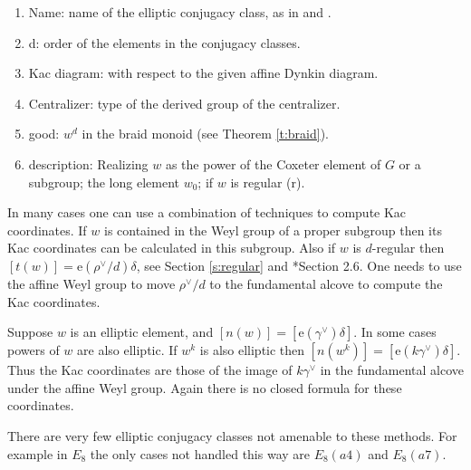 \documentclass[10pt,leqno]{article}
\newcommand{\ch}[1]{#1^\vee}
\newcommand{\e}{\text{e}}
\begin{document}
\begin{enumerate}
\item Name: name of the elliptic conjugacy class, as in \cite{carter_conjugacy_classes} and \cite{geck_pfeiffer}.
\item d: order of the elements in the conjugacy classes.
\item Kac diagram: with respect to the given affine Dynkin diagram.
\item Centralizer: type of the derived group of the centralizer.
\item good: $w^d$ in the braid monoid (see Theorem \ref{t:braid}).
\item description: Realizing $w$ as the power of the Coxeter element of $G$ or a subgroup;
  the long element $w_0$;
if $w$ is regular (r).
\end{enumerate}

In many cases one can use a combination of techniques to compute Kac
coordinates.  If $w$ is contained in the Weyl group of a proper subgroup
then its Kac coordinates can
be calculated in this subgroup. 
Also if  $w$ is $d$-regular then $[t(w)]=\e(\ch\rho/d)\delta$, see Section
\ref{s:regular} and \cite{reeder_torsion}*{Section 2.6}.  
One needs to use the affine Weyl group to move $\ch\rho/d$ to the
fundamental alcove to compute the Kac coordinates.

Suppose $w$ is an elliptic element, and 
$[n(w)]=[\e(\ch\gamma)\delta]$. In some cases powers of $w$ are also elliptic. If  $w^k$ is also elliptic then
$[n(w^k)]=[\e(k\ch\gamma)\delta]$.  Thus the Kac coordinates are
those of the image of $k\ch\gamma$ in the fundamental alcove under the
affine Weyl group. Again there is no closed formula for these
coordinates.

There are very few elliptic conjugacy classes not amenable to these methods.
For example in $E_8$ the only cases not handled this way are 
$E_8(a4)$ and $E_8(a7)$. 
\end{document}
